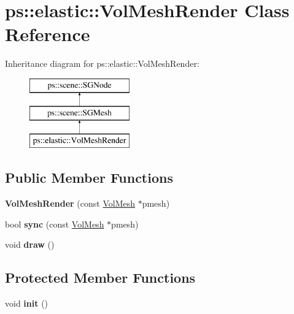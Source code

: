 \hypertarget{classps_1_1elastic_1_1VolMeshRender}{}\section{ps\+:\+:elastic\+:\+:Vol\+Mesh\+Render Class Reference}
\label{classps_1_1elastic_1_1VolMeshRender}
Inheritance diagram for ps\+:\+:elastic\+:\+:Vol\+Mesh\+Render\+:\begin{figure}[H]
\begin{center}
\leavevmode
\includegraphics[height=3.000000cm]{classps_1_1elastic_1_1VolMeshRender}
\end{center}
\end{figure}
\subsection*{Public Member Functions}
\begin{DoxyCompactItemize}
\item 
\hypertarget{classps_1_1elastic_1_1VolMeshRender_ae87850be6fc3056ef1b9cd804b99b34b}{}{\bfseries Vol\+Mesh\+Render} (const \hyperlink{classps_1_1elastic_1_1VolMesh}{Vol\+Mesh} $\ast$pmesh)\label{classps_1_1elastic_1_1VolMeshRender_ae87850be6fc3056ef1b9cd804b99b34b}

\item 
\hypertarget{classps_1_1elastic_1_1VolMeshRender_a1bfcb288cd456c1ef72ace62553d58fb}{}bool {\bfseries sync} (const \hyperlink{classps_1_1elastic_1_1VolMesh}{Vol\+Mesh} $\ast$pmesh)\label{classps_1_1elastic_1_1VolMeshRender_a1bfcb288cd456c1ef72ace62553d58fb}

\item 
\hypertarget{classps_1_1elastic_1_1VolMeshRender_ace1c272b97e63490bdf820e1691c8729}{}void {\bfseries draw} ()\label{classps_1_1elastic_1_1VolMeshRender_ace1c272b97e63490bdf820e1691c8729}

\end{DoxyCompactItemize}
\subsection*{Protected Member Functions}
\begin{DoxyCompactItemize}
\item 
\hypertarget{classps_1_1elastic_1_1VolMeshRender_ab7c80c0189ba99c6b868c497ea28bd51}{}void {\bfseries init} ()\label{classps_1_1elastic_1_1VolMeshRender_ab7c80c0189ba99c6b868c497ea28bd51}

\end{DoxyCompactItemize}
